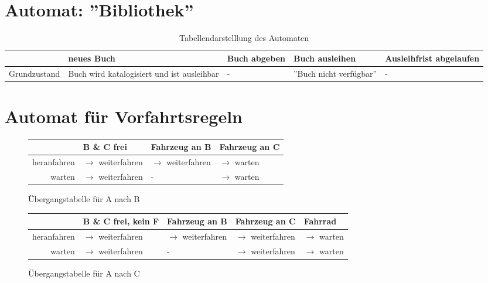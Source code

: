 \documentclass[11pt,a4paper]{article}
\begin{document}
	\newpage
	\section{Automat: ''Bibliothek''}
		\begin{sidewaystable}[H]
			\centering
			\begin{tabular}{c | p{2.5cm} p{2.5cm} p{2.5cm} p{4cm}}
				&	neues Buch	&	Buch abgeben	&	Buch ausleihen 	&	Ausleihfrist abgelaufen	\\ \hline
									
				Grundzustand	&	\tiny Buch wird katalogisiert und ist ausleihbar	& - &	\tiny ''Buch nicht verfügbar''	& -	\\
				
				
			\end{tabular}
			
			\caption{Tabellendarstelllung des Automaten}
			\label{tab:t1}
		\end{sidewaystable}
	\section{Automat für Vorfahrtsregeln}
	
		\begin{figure}[h]
			\centering
			
			\begin{tabular}{r | l l l}
				& B \& C frei & Fahrzeug an B & Fahrzeug an C \\ \hline
				heranfahren & $\rightarrow$ weiterfahren & $\rightarrow$ weiterfahren & $\rightarrow$ warten \\
				warten & $\rightarrow$ weiterfahren & - & $\rightarrow$ warten \\
			\end{tabular}			
			\caption{Übergangstabelle für A nach B}
			\label{tab:t2}
		\end{figure}
		
		\begin{figure}[h]
			\begin{tabular}{r | l l l l}
				& B \& C frei, kein F & Fahrzeug an B & Fahrzeug an C & Fahrrad \\ \hline
				heranfahren & $\rightarrow$ weiterfahren & $\rightarrow$ weiterfahren & $\rightarrow$ weiterfahren & $\rightarrow$ warten \\
				warten & $\rightarrow$ weiterfahren & - & $\rightarrow$ weiterfahren & $\rightarrow$ warten \\
			\end{tabular}			
			\caption{Übergangstabelle für A nach C}
			\label{tab:t3}
		\end{figure}
		
\end{document}
